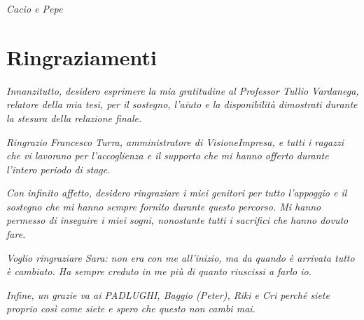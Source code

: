 \cleardoublepage
{}
{}

\begin{flushright}{
    \slshape
    Cacio e Pepe \\}
\end{flushright}

\begingroup
\let\clearpage\relax
\let\cleardoublepage\relax
\let\cleardoublepage\relax

\chapter*{Ringraziamenti}

\noindent 
\vspace{0.35cm}

\noindent \textit{Innanzitutto, desidero esprimere la mia gratitudine al Professor Tullio Vardanega, relatore della mia tesi, per il sostegno, l'aiuto e la disponibilità dimostrati durante la stesura della relazione finale.}

\vspace{0.35cm}

\noindent \textit{Ringrazio Francesco Turra, amministratore di VisioneImpresa, e tutti i ragazzi che vi lavorano per l'accoglienza e il supporto che mi hanno offerto durante l'intero periodo di stage.}

\vspace{0.35cm}

\noindent \textit{Con infinito affetto, desidero ringraziare i miei genitori per tutto l'appoggio e il sostegno che mi hanno sempre fornito durante questo percorso. Mi hanno permesso di inseguire i miei sogni, nonostante tutti i sacrifici che hanno dovuto fare.}

\vspace{0.35cm}

\noindent\textit{Voglio ringraziare Sara: non era con me all'inizio, ma da quando è arrivata tutto è cambiato. Ha sempre creduto in me più di quanto riuscissi a farlo io.}

\vspace{0.35cm}

\noindent \textit{Infine, un grazie va ai PADLUGHI, Baggio (Peter), Riki e Cri perché siete proprio così come siete e spero che questo non cambi mai.}

\vspace{0.75cm}

\noindent{\myLocation, \myTime}
\hfill \textit{\myName}

\endgroup
